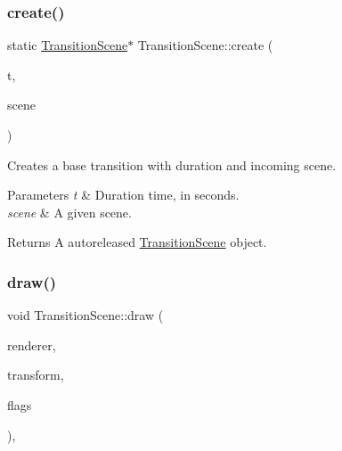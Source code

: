 \subsubsection{\texorpdfstring{create()}{create()}\hspace{0.1cm}{\footnotesize\ttfamily [2/2]}}
{\footnotesize\ttfamily static \hyperlink{classTransitionScene}{Transition\+Scene}$\ast$ Transition\+Scene\+::create (\begin{DoxyParamCaption}\item[{float}]{t,  }\item[{\hyperlink{classScene}{Scene} $\ast$}]{scene }\end{DoxyParamCaption})\hspace{0.3cm}{\ttfamily [static]}}

Creates a base transition with duration and incoming scene.


\begin{DoxyParams}{Parameters}
{\em t} & Duration time, in seconds. \\
\hline
{\em scene} & A given scene. \\
\hline
\end{DoxyParams}
\begin{DoxyReturn}{Returns}
A autoreleased \hyperlink{classTransitionScene}{Transition\+Scene} object. 
\end{DoxyReturn}
\mbox{\label{classTransitionScene_ae3600e652909eeae3113bc39ce8ef8d1}} 
\subsubsection{\texorpdfstring{draw()}{draw()}\hspace{0.1cm}{\footnotesize\ttfamily [1/2]}}
{\footnotesize\ttfamily void Transition\+Scene\+::draw (\begin{DoxyParamCaption}\item[{\hyperlink{classRenderer}{Renderer} $\ast$}]{renderer,  }\item[{const \hyperlink{classMat4}{Mat4} \&}]{transform,  }\item[{uint32\+\_\+t}]{flags }\end{DoxyParamCaption})\hspace{0.3cm}{\ttfamily [override]}, {\ttfamily [virtual]}}

